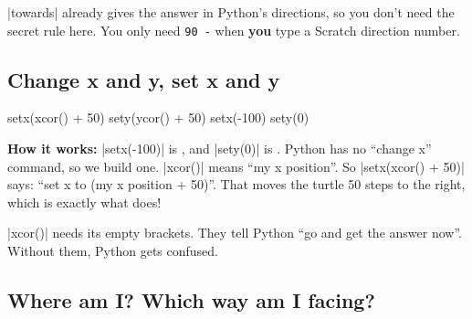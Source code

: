 \begin{think}
\py|towards| already gives the answer in Python's directions, so you don't need the secret rule here. You only need \texttt{90 -} when \textbf{you} type a Scratch direction number.
\end{think}

\subsection*{Change x and y, set x and y}

\begin{tcbraster}[raster columns=2, raster equal height=rows, raster column skip=12pt, raster valign=center]
\begin{tcolorbox}[colback=white, colframe=white, boxrule=0pt, valign=center]
\begin{scratch}
\end{scratch}
\end{tcolorbox}
\begin{code}
setx(xcor() + 50)
sety(ycor() + 50)
setx(-100)
sety(0)
\end{code}
\end{tcbraster}

\textbf{How it works:} \py|setx(-100)| is , and \py|sety(0)| is . Python has no ``change x'' command, so we build one. \py|xcor()| means ``my x position''. So \py|setx(xcor() + 50)| says: ``set x to (my x position + 50)''. That moves the turtle 50 steps to the right, which is exactly what  does!

\begin{watchout}
\py|xcor()| needs its empty brackets. They tell Python ``go and get the answer now''. Without them, Python gets confused.
\end{watchout}

\subsection*{Where am I? Which way am I facing?}

